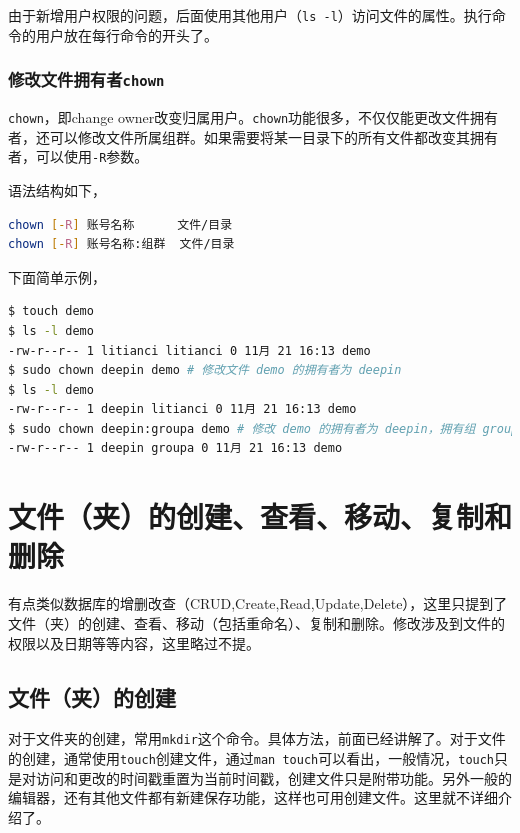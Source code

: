 \documentclass[doctor,openright,twoside]{sjtuthesis}
\newcommand{\passthrough}[1]{#1}
\theoremstyle{plain}
\theoremstyle{definition}
\theoremstyle{remark}
\theoremstyle{ocrenumbox}
\theoremstyle{plain}
\begin{document}
由于新增用户权限的问题，后面使用其他用户（\passthrough{\lstinline!ls -l!}）访问文件的属性。执行命令的用户放在每行命令的开头了。

\hypertarget{chown}{%
\subsubsection{\texorpdfstring{修改文件拥有者\texttt{chown}}{修改文件拥有者chown}}\label{chown}}

\passthrough{\lstinline!chown!}，即change
owner改变归属用户。\passthrough{\lstinline!chown!}功能很多，不仅仅能更改文件拥有者，还可以修改文件所属组群。如果需要将某一目录下的所有文件都改变其拥有者，可以使用\passthrough{\lstinline!-R!}参数。

语法结构如下，

\begin{lstlisting}[language=bash]
chown [-R] 账号名称      文件/目录
chown [-R] 账号名称:组群  文件/目录
\end{lstlisting}

下面简单示例，

\begin{lstlisting}[language=bash]
$ touch demo
$ ls -l demo
-rw-r--r-- 1 litianci litianci 0 11月 21 16:13 demo
$ sudo chown deepin demo # 修改文件 demo 的拥有者为 deepin
$ ls -l demo
-rw-r--r-- 1 deepin litianci 0 11月 21 16:13 demo
$ sudo chown deepin:groupa demo # 修改 demo 的拥有者为 deepin，拥有组 groupa
-rw-r--r-- 1 deepin groupa 0 11月 21 16:13 demo
\end{lstlisting}

\section{文件（夹）的创建、查看、移动、复制和删除}

有点类似数据库的增删改查（CRUD,Create,Read,Update,Delete），这里只提到了文件（夹）的创建、查看、移动（包括重命名）、复制和删除。修改涉及到文件的权限以及日期等等内容，这里略过不提。

\subsection{文件（夹）的创建}

对于文件夹的创建，常用\passthrough{\lstinline!mkdir!}这个命令。具体方法，前面已经讲解了。对于文件的创建，通常使用\passthrough{\lstinline!touch!}创建文件，通过\passthrough{\lstinline!man touch!}可以看出，一般情况，\passthrough{\lstinline!touch!}只是对访问和更改的时间戳重置为当前时间戳，创建文件只是附带功能。另外一般的编辑器，还有其他文件都有新建保存功能，这样也可用创建文件。这里就不详细介绍了。
\end{document}
